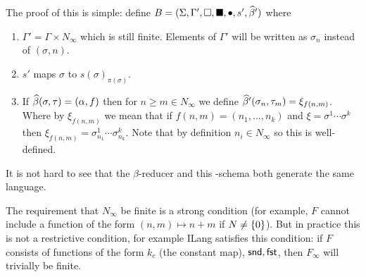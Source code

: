\documentclass{llncs}
\begin{document}
The proof of this is simple: define $B=(\Sigma,\Gamma',\square,\blacksquare,\bullet,s',\widehat\beta')$ where
\begin{enumerate}
    \item $\Gamma'=\Gamma\times N_\infty$ which is still finite.
        Elements of $\Gamma'$ will be written as $\sigma_n$ instead of $(\sigma,n)$.
    \item $s'$ maps $\sigma$ to $s(\sigma)_{\pi(\sigma)}$.
    \item If $\widehat\beta(\sigma,\tau)=(\alpha,f)$ then for $n\geq m\in N_\infty$ we define $\widehat\beta'(\sigma_n,\tau_m)=\xi_{f(n,m)}$.
        Where by $\xi_{f(n,m)}$ we mean that if $f(n,m)=(n_1,\dots,n_k)$ and $\xi=\sigma^1\cdots\sigma^k$ then
        $\xi_{f(n,m)}=\sigma^1_{n_1}\cdots\sigma^k_{n_k}$.
        Note that by definition $n_i\in N_\infty$ so this is well-defined.
\end{enumerate}
It is not hard to see that the $\beta$-reducer and this \BR-schema both generate the same language.

The requirement that $N_\infty$ be finite is a strong condition (for example, $F$ cannot include a function of the form $(n,m)\mapsto n+m$ if $N\neq\set0$).
But in practice this is not a restrictive condition, for example ILang satisfies this condition: if $F$ consists of functions of the form $k_c$ (the constant map), $\mathsf{snd},\mathsf{fst}$, then $F_\infty$ will trivially be finite.
\end{document}
